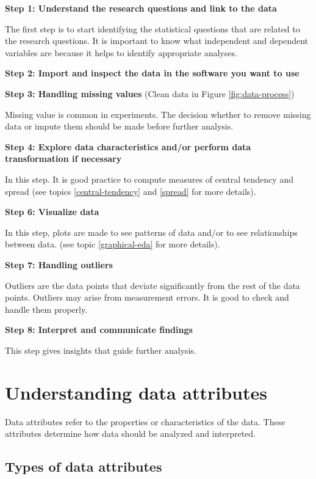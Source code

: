 \documentclass[
]{book}
\begin{document}
\textbf{Step 1: Understand the research questions and link to the data}

The first step is to start identifying the statistical questions that are related to the research questions. It is important to know what independent and dependent variables are because it helps to identify appropriate analyses.

\textbf{Step 2: Import and inspect the data in the software you want to use}

\textbf{Step 3: Handling missing values}
(Clean data in Figure \ref{fig:data-process})

Missing value is common in experiments. The decision whether to remove missing data or impute them should be made before further analysis.

\textbf{Step 4: Explore data characteristics and/or perform data transformation if necessary}

In this step. It is good practice to compute measures of central tendency and spread (see topics \ref{central-tendency} and \ref{spread} for more details).

\textbf{Step 6: Visualize data}

In this step, plots are made to see patterns of data and/or to see relationships between data. (see topic \ref{graphical-eda} for more details).

\textbf{Step 7: Handling outliers}

Outliers are the data points that deviate significantly from the rest of the data points. Outliers may arise from measurement errors. It is good to check and handle them properly.

\textbf{Step 8: Interpret and communicate findings}

This step gives insights that guide further analysis.

\section{Understanding data attributes}\label{understanding-data-attributes}

Data attributes refer to the properties or characteristics of the data. These attributes determine how data should be analyzed and interpreted.

\subsection{Types of data attributes}\label{types-of-data-attributes}
\end{document}
